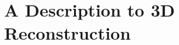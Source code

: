 \documentclass{beamer}
\begin{document}



\section{A Description to 3D Reconstruction} %
\end{document}
